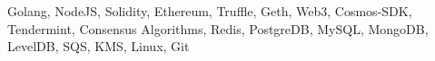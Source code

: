 \vspace{-0.5em}
\vspace{-1.5em}
\begin{cventries}
  \cventry
    {}
    {}
    {}{}
    {
      \begin{cvitems}
        \item {Golang, NodeJS, Solidity, Ethereum, Truffle, Geth, Web3, Cosmos-SDK, Tendermint, Consensus Algorithms, Redis, PostgreDB, MySQL, MongoDB, LevelDB, SQS, KMS, Linux, Git}         
      \end{cvitems}
    }
    
\end{cventries}
